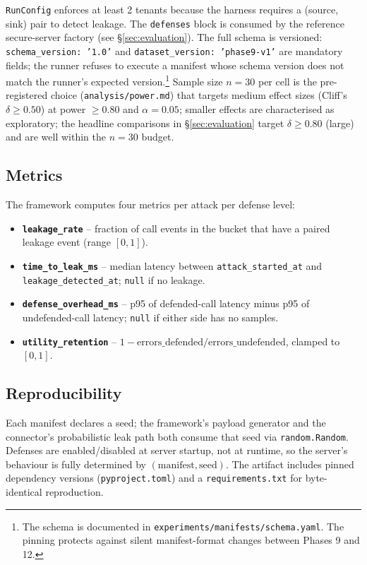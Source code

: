 \texttt{RunConfig} enforces at least 2 tenants because the
harness requires a (source, sink) pair to detect leakage. The
\texttt{defenses} block is consumed by the reference
secure-server factory (see \S\ref{sec:evaluation}). The full
schema is versioned: \texttt{schema\_version: '1.0'} and
\texttt{dataset\_version: 'phase9-v1'} are mandatory fields;
the runner refuses to execute a manifest whose schema version
does not match the runner's expected version.\footnote{The
schema is documented in
\texttt{experiments/manifests/schema.yaml}. The pinning
protects against silent manifest-format changes between
Phases 9 and 12.} Sample size $n = 30$ per cell is the
pre-registered choice (\texttt{analysis/power.md}) that
targets medium effect sizes (Cliff's $\delta \geq 0.50$)
at power $\geq 0.80$ and $\alpha = 0.05$; smaller effects
are characterised as exploratory; the headline comparisons
in \S\ref{sec:evaluation} target $\delta \geq 0.80$ (large)
and are well within the $n = 30$ budget.

\subsection{Metrics}

The framework computes four metrics per attack per defense
level:

\begin{itemize}
  \item \textbf{\texttt{leakage\_rate}} -- fraction of call
        events in the bucket that have a paired leakage event
        (range $[0, 1]$).
  \item \textbf{\texttt{time\_to\_leak\_ms}} -- median latency
        between \texttt{attack\_started\_at} and
        \texttt{leakage\_detected\_at}; \texttt{null} if no
        leakage.
  \item \textbf{\texttt{defense\_overhead\_ms}} -- p95 of
        defended-call latency minus p95 of undefended-call
        latency; \texttt{null} if either side has no samples.
  \item \textbf{\texttt{utility\_retention}} -- $1 -
        \mathrm{errors\_defended}/\mathrm{errors\_undefended}$,
        clamped to $[0, 1]$.
\end{itemize}

\subsection{Reproducibility}

Each manifest declares a seed; the framework's payload
generator and the connector's probabilistic leak path both
consume that seed via \texttt{random.Random}. Defenses are
enabled/disabled at server startup, not at runtime, so the
server's behaviour is fully determined by
$(\mathrm{manifest}, \mathrm{seed})$. The artifact includes
pinned dependency versions (\texttt{pyproject.toml}) and a
\texttt{requirements.txt} for byte-identical reproduction.

